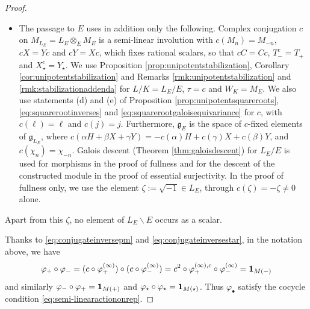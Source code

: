 \documentclass[a4paper,12pt,reqno]{amsart}
\theoremstyle{plain}
\theoremstyle{remark}
\begin{document}
\begin{proof}
\begin{itemize}
    \item[(ii)] The passage to $E$ uses in addition only the following. Complex conjugation $c$ on $M_{L_E}=L_E\otimes_E M_E$ is a semi-linear involution with $c(M_n)=M_{-n}$, $cX=Yc$ and $cY=Xc$, which fixes rational scalars, so that $cC=Cc$, $T_-^c=T_+$ and $X_\star^c=Y_\star$. We use Proposition \ref{prop:unipotentstabilization}, Corollary \ref{cor:unipotentstabilization} and Remarks \ref{rmk:unipotentstabilization} and \ref{rmk:stabilizationaddenda} for $L/K=L_E/E$, $\tau=c$ and $W_K=M_E$. We also use statements (d) and (e) of Proposition \ref{prop:unipotentsquareroots}, \eqref{eq:squarerootinverses} and \eqref{eq:squarerootgaloisequivariance} for $c$, with $c(\ell)=\ell$ and $c(j)=j$. Furthermore, $\mathfrak{g}_E$ is the space of $c$-fixed elements of $\mathfrak{g}_{L_E}$, where $c(\alpha H+\beta X+\gamma Y)=-c(\alpha)H+c(\gamma)X+c(\beta)Y$, and $c(\chi_n)=\chi_{-n}$. Galois descent (Theorem \ref{thm:galoisdescent}) for $L_E/E$ is used for morphisms in the proof of fullness and for the descent of the constructed module in the proof of essential surjectivity. In the proof of fullness only, we use the element $\zeta:=\sqrt{-1}\in L_E$, through $c(\zeta)=-\zeta\neq0$ alone.
    \end{itemize}
    Apart from this $\zeta$, no element of $L_E\smallsetminus E$ occurs as a scalar.

    \smallskip
    Thanks to \eqref{eq:conjugateinversepm} and \eqref{eq:conjugateinversestar}, in the notation above, we have
    \[
    \varphi_+\circ\varphi_-=(c\circ\varphi_+^{(\infty)})\circ(c\circ\varphi_-^{(\infty)})=c^2\circ\varphi_+^{(\infty),c}\circ\varphi_-^{(\infty)}={\bf1}_{M(-)}
    \]
    and similarly $\varphi_-\circ\varphi_+={\bf1}_{M(+)}$ and $\varphi_\star\circ\varphi_\star={\bf1}_{M(\star)}$. Thus $\varphi_\bullet$ satisfy the cocycle condition \eqref{eq:semi-linearactiononrep}.


\end{proof}
\end{document}
